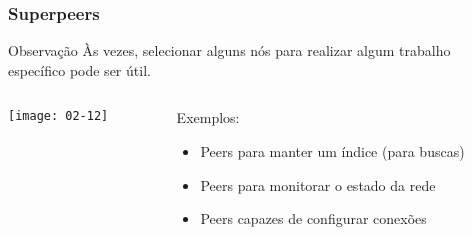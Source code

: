 \documentclass[Ligatures=TeX,table,brazil,svgnames,usetotalslideindicator,compress,10pt]{beamer}
\begin{document}
\begin{frame}
  \frametitle{Superpeers}
  \begin{block}{Observação}
    Às vezes, selecionar alguns nós para realizar algum trabalho específico pode ser útil.
  \end{block}

  \begin{columns}\small
    \begin{column}{0.5\textwidth}
      \texttt{[image: 02-12]}
    \end{column}

    \begin{column}{0.4\textwidth}

      \begin{exampleblock}{Exemplos:}
        \begin{itemize}
        \item Peers para manter um índice (para buscas)
        \item Peers para monitorar o estado da rede
        \item Peers capazes de configurar conexões
        \end{itemize}
      \end{exampleblock}

    \end{column}
  \end{columns}

\end{frame}
\end{document}
